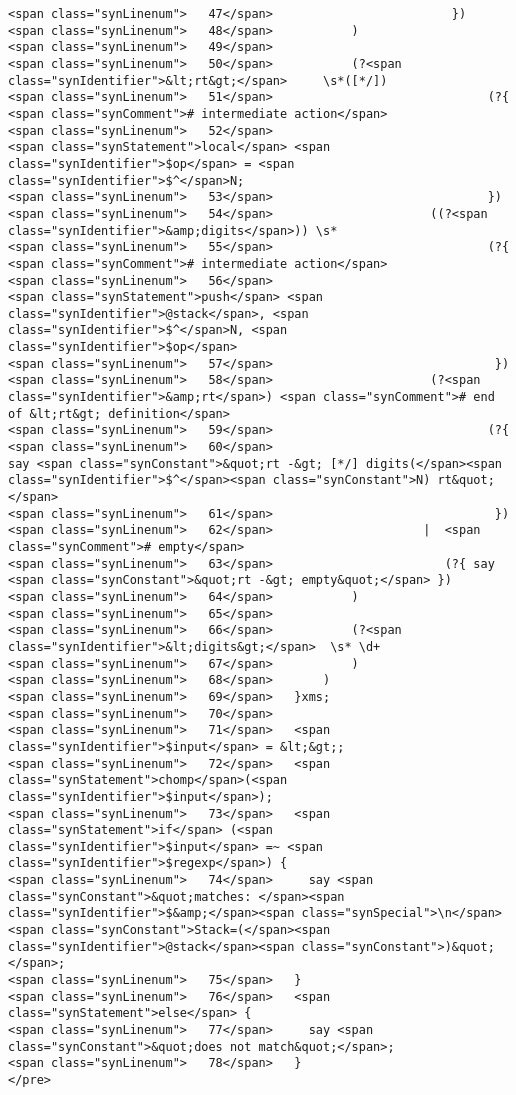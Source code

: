 \begin{verbatim}
<span class="synLinenum">   47</span>                         })
<span class="synLinenum">   48</span>           )
<span class="synLinenum">   49</span> 
<span class="synLinenum">   50</span>           (?<span class="synIdentifier">&lt;rt&gt;</span>     \s*([*/])
<span class="synLinenum">   51</span>                              (?{ <span class="synComment"># intermediate action</span>
<span class="synLinenum">   52</span>                                 <span class="synStatement">local</span> <span class="synIdentifier">$op</span> = <span class="synIdentifier">$^</span>N;
<span class="synLinenum">   53</span>                              })
<span class="synLinenum">   54</span>                      ((?<span class="synIdentifier">&amp;digits</span>)) \s*
<span class="synLinenum">   55</span>                              (?{  <span class="synComment"># intermediate action</span>
<span class="synLinenum">   56</span>                                   <span class="synStatement">push</span> <span class="synIdentifier">@stack</span>, <span class="synIdentifier">$^</span>N, <span class="synIdentifier">$op</span>
<span class="synLinenum">   57</span>                               })
<span class="synLinenum">   58</span>                      (?<span class="synIdentifier">&amp;rt</span>) <span class="synComment"># end of &lt;rt&gt; definition</span>
<span class="synLinenum">   59</span>                              (?{
<span class="synLinenum">   60</span>                                   say <span class="synConstant">&quot;rt -&gt; [*/] digits(</span><span class="synIdentifier">$^</span><span class="synConstant">N) rt&quot;</span>
<span class="synLinenum">   61</span>                               })
<span class="synLinenum">   62</span>                     |  <span class="synComment"># empty</span>
<span class="synLinenum">   63</span>                        (?{ say <span class="synConstant">&quot;rt -&gt; empty&quot;</span> })
<span class="synLinenum">   64</span>           )
<span class="synLinenum">   65</span> 
<span class="synLinenum">   66</span>           (?<span class="synIdentifier">&lt;digits&gt;</span>  \s* \d+
<span class="synLinenum">   67</span>           )
<span class="synLinenum">   68</span>       )
<span class="synLinenum">   69</span>   }xms;
<span class="synLinenum">   70</span> 
<span class="synLinenum">   71</span>   <span class="synIdentifier">$input</span> = &lt;&gt;;
<span class="synLinenum">   72</span>   <span class="synStatement">chomp</span>(<span class="synIdentifier">$input</span>);
<span class="synLinenum">   73</span>   <span class="synStatement">if</span> (<span class="synIdentifier">$input</span> =~ <span class="synIdentifier">$regexp</span>) {
<span class="synLinenum">   74</span>     say <span class="synConstant">&quot;matches: </span><span class="synIdentifier">$&amp;</span><span class="synSpecial">\n</span><span class="synConstant">Stack=(</span><span class="synIdentifier">@stack</span><span class="synConstant">)&quot;</span>;
<span class="synLinenum">   75</span>   }
<span class="synLinenum">   76</span>   <span class="synStatement">else</span> {
<span class="synLinenum">   77</span>     say <span class="synConstant">&quot;does not match&quot;</span>;
<span class="synLinenum">   78</span>   }
</pre>


\end{verbatim}
